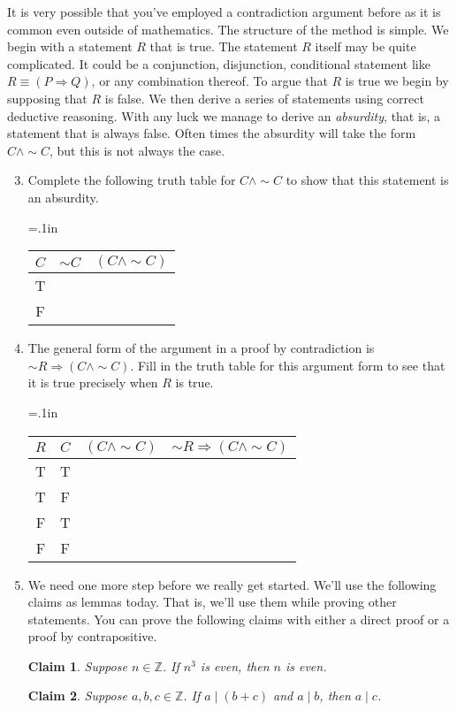 \documentclass[12 pt]{article}
\newcommand{\Z}{\mathbb{Z}}
\newcommand{\Ra}{\Rightarrow}
\newcommand{\divides}{\! \mid \!}
\theoremstyle{definition}
\theoremstyle{plain}
\theoremstyle{mytheorem}
\theoremstyle{myexample}
\newtheorem{claim}{Claim}
\theoremstyle{mydefinition}
\begin{document}
\noindent It is very possible that you've employed a contradiction argument before as it is common even outside of mathematics.  The structure of the method is simple.  We begin with a statement $R$ that is true.  The statement $R$ itself may be quite complicated.  It could be a conjunction, disjunction, conditional statement like $R \equiv (P \Ra Q)$, or any combination thereof.  To argue that $R$ is true we begin by supposing that $R$ is false.  We then derive a series of statements using correct deductive reasoning.  With any luck we manage to derive an \textit{absurdity}, that is, a statement that is always false.  Often times the absurdity will take the form $C \wedge \sim C$, but this is not always the case.

\begin{enumerate} \setcounter{enumi}{2}
\item Complete the following truth table for $C \wedge \sim C$ to show that this statement is an absurdity.
\begin{center}
	{\tabulinesep=.1in
	\begin{tabu}{c||c|c}
	$C$ & $\sim C$ & $(C \wedge \sim C)$\\
	\hline
	T & \ & \ \\
	F & \ & \ \\
	\end{tabu}}
	\end{center}
	
\item The general form of the argument in a proof by contradiction is $\sim R \Rightarrow (C \wedge \sim C)$.  Fill in the truth table for this argument form to see that it is true precisely when $R$ is true.
\begin{center}
	{\tabulinesep=.1in
	\begin{tabu}{c|c||c|c}
	$R$ & $C$ & $(C \wedge \sim C)$ & $\sim R \Rightarrow (C \wedge \sim C)$\\
	\hline
	T & T & \ & \ \\
	T & F & \ & \ \\
	F & T & \ & \ \\
	F & F & \ & \ \\
	\end{tabu}
	}
	\end{center}
	
\item We need one more step before we really get started.  We'll use the following claims as lemmas today.  That is, we'll use them while proving other statements.  You can prove the following claims with either a direct proof or a proof by contrapositive.
	\begin{claim}  Suppose $n \in \Z$.  If $n^3$ is even, then $n$ is even.
	\end{claim}
	
		\vspace{3in}
	
	\begin{claim} Suppose $a,b,c \in \Z$.  If $a \divides (b+c)$ and $a \divides b$, then $a \divides c$.
	\end{claim}
	
		\vspace{3in}
\end{enumerate} 
\end{document}
